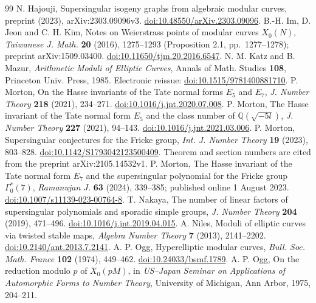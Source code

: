 \documentclass[11pt,a4paper]{article}
\theoremstyle{remark}\newtheorem{remark}[theorem]{Remark}
\numberwithin{equation}{section}
\newcommand{\Q}{\mathbb Q}\newcommand{\Z}{\mathbb Z}
\begin{document}
\begin{thebibliography}{99}
		 N. Hajouji, Supersingular isogeny graphs from algebraic modular curves, preprint (2023), arXiv:2303.09096v3. \href{https://doi.org/10.48550/arXiv.2303.09096}{doi:10.48550/arXiv.2303.09096}.
		 B.-H. Im, D. Jeon and C. H. Kim, Notes on Weierstrass points of modular curves $X_0(N)$, \emph{Taiwanese J. Math.} \textbf{20} (2016), 1275--1293 (Proposition 2.1, pp.~1277--1278); preprint arXiv:1509.03400. \href{https://doi.org/10.11650/tjm.20.2016.6547}{doi:10.11650/tjm.20.2016.6547}.
		 N. M. Katz and B. Mazur, \emph{Arithmetic Moduli of Elliptic Curves}, Annals of Math. Studies \textbf{108}, Princeton Univ. Press, 1985. Electronic reissue: \href{https://doi.org/10.1515/9781400881710}{doi:10.1515/9781400881710}.
		 P. Morton, On the Hasse invariants of the Tate normal forms $E_5$ and $E_7$, \emph{J. Number Theory} \textbf{218} (2021), 234--271. \href{https://doi.org/10.1016/j.jnt.2020.07.008}{doi:10.1016/j.jnt.2020.07.008}.
		 P. Morton, The Hasse invariant of the Tate normal form $E_5$ and the class number of $\Q(\sqrt{-5l})$, \emph{J. Number Theory} \textbf{227} (2021), 94--143. \href{https://doi.org/10.1016/j.jnt.2021.03.006}{doi:10.1016/j.jnt.2021.03.006}.
	 P. Morton, Supersingular conjectures for the Fricke group, \emph{Int. J. Number Theory} \textbf{19} (2023), 803--828. \href{https://doi.org/10.1142/S1793042123500409}{doi:10.1142/S1793042123500409}. Theorem and section numbers are cited from the preprint arXiv:2105.14532v1.
		 P. Morton, The Hasse invariant of the Tate normal form $E_7$ and the supersingular polynomial for the Fricke group $\Gamma_0^*(7)$, \emph{Ramanujan J.} \textbf{63} (2024), 339--385; published online 1 August 2023. \href{https://doi.org/10.1007/s11139-023-00764-8}{doi:10.1007/s11139-023-00764-8}.
		 T. Nakaya, The number of linear factors of supersingular polynomials and sporadic simple groups, \emph{J. Number Theory} \textbf{204} (2019), 471--496. \href{https://doi.org/10.1016/j.jnt.2019.04.015}{doi:10.1016/j.jnt.2019.04.015}.
		 A. Niles, Moduli of elliptic curves via twisted stable maps, \emph{Algebra Number Theory} \textbf{7} (2013), 2141--2202. \href{https://doi.org/10.2140/ant.2013.7.2141}{doi:10.2140/ant.2013.7.2141}.
		 A. P. Ogg, Hyperelliptic modular curves, \emph{Bull. Soc. Math. France} \textbf{102} (1974), 449--462. \href{https://doi.org/10.24033/bsmf.1789}{doi:10.24033/bsmf.1789}.
		 A. P. Ogg, On the reduction modulo $p$ of $X_0(pM)$, in \emph{US--Japan Seminar on Applications of Automorphic Forms to Number Theory}, University of Michigan, Ann Arbor, 1975, 204--211.

\end{thebibliography}
\end{document}
